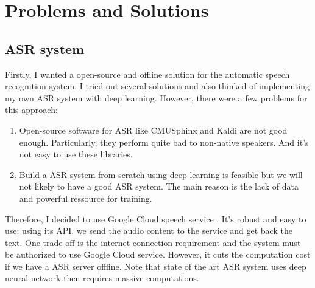 \section{Problems and Solutions}
\subsection{ASR system}
Firstly, I wanted a open-source and offline solution for the automatic speech recognition system. I tried out several solutions and also thinked of implementing my own ASR system with deep learning. However, there were a few problems for this approach:
\begin{enumerate}
	\item Open-source software for ASR like CMUSphinx \cite{CMUSphinx:2017} and Kaldi \cite{Kaldi:2017} are not good enough. Particularly, they perform quite bad to non-native speakers. And it's not easy to use these libraries.
	\item Build a ASR system from scratch using deep learning is feasible but we will not likely to have a good ASR system. The main reason is the lack of data and powerful ressource for training.
\end{enumerate}
Therefore, I decided to use Google Cloud speech service \cite{GoogleCloud:2017}. It's robust and easy to use: using its API, we send the audio content to the service and get back the text. One trade-off is the internet connection requirement and the system must be authorized to use Google Cloud service. However, it cuts the computation cost if we have a ASR server offline. Note that state of the art ASR system uses deep neural network then requires massive computations.

